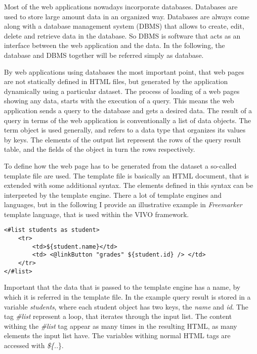Most of the web applications nowadays incorporate databases. Databases are used to store large amount data in an organized way. Databases are always come along with a database management system (DBMS) that allows to create, edit, delete and retrieve data in the database. So DBMS is software that acts as an interface between the web application and the data. In the following, the database and DBMS together will be referred simply as database.  

By web applications using databases the most important point, that web pages are not statically defined in HTML files, but generated by the application dynamically using a particular dataset. The process of loading of a web pages showing any data, starts with the execution of a query. This means the web application sends a query to the database and gets a desired data. The result of a query in terms of the web application is conventionally a list of data objects. The term object is used generally, and refers to a data type that organizes its values by keys. The elements of the output list represent the rows of the query result table, and the fields of the object in turn the rows respectively. 

To define how the web page has to be generated from the dataset a so-called template file are used. The template file is basically an HTML document, that is extended with some additional syntax. The elements defined in this syntax can be interpreted by the template engine. There a lot of template engines and languages, but in the following I provide an illustrative example in \textit{Freemarker} template language, that is used within the VIVO framework.

\begin{lstlisting}[captionpos=b, caption=Template file example, label=skullJSON, belowskip=1em, aboveskip=2em,
basicstyle=\footnotesize,frame=single]
<#list students as student>
	<tr>
		<td>${student.name}</td>
		<td> <@linkButton "grades" ${student.id} /> </td>
	</tr>
</#list>
\end{lstlisting}

Important that the data that is passed to the template engine has a name, by which it is referred in the template file. In the example query result is stored in a variable \textit{students}, where each student object has two keys, the \textit{name} and \textit{id}. The tag \textit{\#list} represent a loop, that iterates through the input list. The content withing the \textit{\#list} tag appear as many times in the resulting HTML, as many elements the input list have. The variables withing normal HTML tags are accessed with \textit{\$\{..}\}. 

